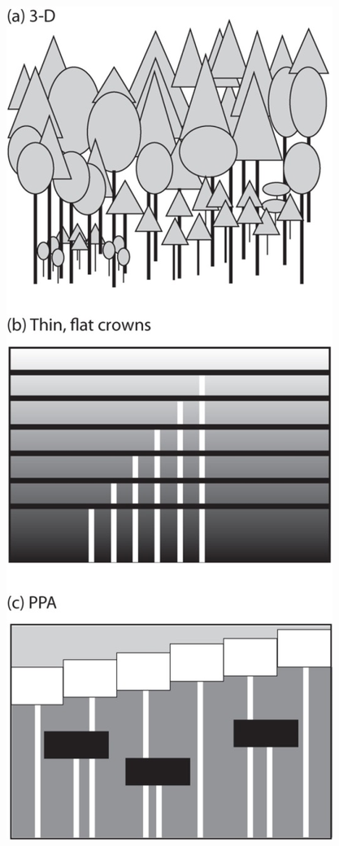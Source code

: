 \documentclass[
  12pt,
  oneside]{book}
\begin{document}
\begin{figure}

{\centering \includegraphics[width=0.8\linewidth]{figures/chap6/f627_light_comp} 

}
\end{figure}
\end{document}
